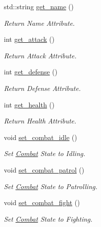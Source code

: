 \begin{DoxyCompactItemize}
std\+::string \mbox{\hyperlink{classActor_a55a6dcdcec5931619506b2a76ccb9db5}{get\+\_\+name}} ()
\begin{DoxyCompactList}\small\item\em Return Name Attribute. \end{DoxyCompactList}\item 
int \mbox{\hyperlink{classActor_a10f4cbdafcc6aea7d3a9a4cfa78ef15f}{get\+\_\+attack}} ()
\begin{DoxyCompactList}\small\item\em Return Attack Attribute. \end{DoxyCompactList}\item 
int \mbox{\hyperlink{classActor_a9ad76549333736c7b76a4b78bf46cc17}{get\+\_\+defense}} ()
\begin{DoxyCompactList}\small\item\em Return Defense Attribute. \end{DoxyCompactList}\item 
int \mbox{\hyperlink{classActor_a32de439dc3ba0d36ae913b173b4b633f}{get\+\_\+health}} ()
\begin{DoxyCompactList}\small\item\em Return Health Attribute. \end{DoxyCompactList}\item 
\mbox{\label{classActor_a760913da638e0e92b2ec47d0764a4028}} 
void \mbox{\hyperlink{classActor_a760913da638e0e92b2ec47d0764a4028}{set\+\_\+combat\+\_\+idle}} ()
\begin{DoxyCompactList}\small\item\em Set \mbox{\hyperlink{classCombat}{Combat}} State to Idling. \end{DoxyCompactList}\item 
\mbox{\label{classActor_a313f15612961c7468b4b7283be8dc87c}} 
void \mbox{\hyperlink{classActor_a313f15612961c7468b4b7283be8dc87c}{set\+\_\+combat\+\_\+patrol}} ()
\begin{DoxyCompactList}\small\item\em Set \mbox{\hyperlink{classCombat}{Combat}} State to Patrolling. \end{DoxyCompactList}\item 
\mbox{\label{classActor_ada813b8eb87215f047e8a76a4a46f4b1}} 
void \mbox{\hyperlink{classActor_ada813b8eb87215f047e8a76a4a46f4b1}{set\+\_\+combat\+\_\+fight}} ()
\begin{DoxyCompactList}\small\item\em Set \mbox{\hyperlink{classCombat}{Combat}} State to Fighting. \end{DoxyCompactList}\item 

\end{DoxyCompactItemize}
